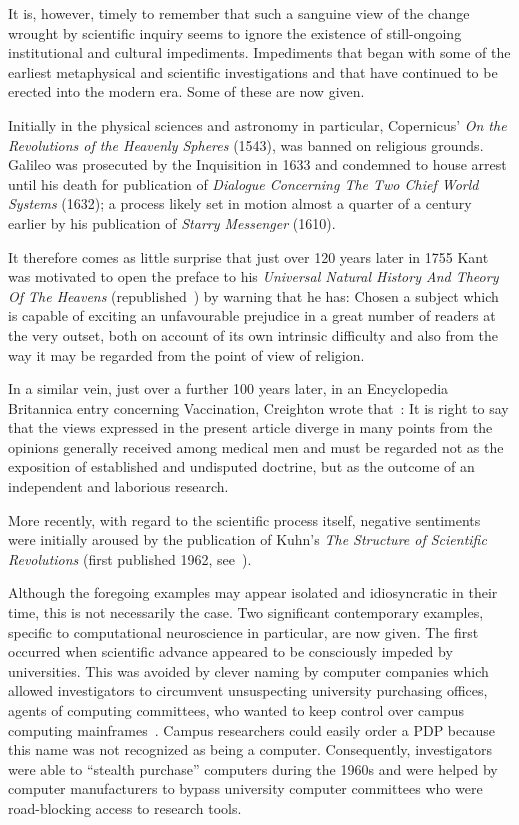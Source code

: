 \documentclass[10pt,letterpaper]{article}
\begin{document}
It is, however, timely to remember that such a sanguine view of the change wrought by scientific inquiry seems to ignore the existence of still-ongoing  institutional and cultural impediments. Impediments that began with some of the earliest metaphysical and scientific investigations and that have continued to be erected into the modern era. Some of these are now given.

Initially in the physical sciences and astronomy in particular, Copernicus' {\it{On the Revolutions of the Heavenly Spheres}} (1543), was banned on religious grounds. Galileo was prosecuted by the Inquisition in 1633 and condemned to house arrest until his death for publication of {\it{Dialogue Concerning The Two Chief World Systems}} (1632); a process likely set in motion almost a quarter of a century earlier by his publication of {\it{Starry Messenger}} (1610).

It therefore comes as little surprise that just over 120 years later in 1755 Kant~\cite{kant08} was motivated to open the preface to his {\it{Universal Natural History And Theory Of The Heavens}} (republished~\cite{kant08}) by warning that he has: Chosen a subject which is capable of exciting an unfavourable prejudice in a great number of readers at the very outset, both on account of its own intrinsic difficulty and also from the way it may be regarded from the point of view of religion.
 
In a similar vein, just over a further 100 years later, in an Encyclopedia Britannica entry concerning Vaccination, Creighton wrote that~\cite{creighton88}: It is right to say that the views expressed in the present article diverge in many points from the opinions generally received among medical men and must be regarded not as the exposition of established and undisputed doctrine, but as the outcome of an independent and laborious research.

More recently, with regard to the scientific process itself, negative sentiments were initially aroused by the publication of Kuhn's {\it The Structure of Scientific Revolutions} (first published 1962, see~\cite{bird22}).

Although the foregoing examples may appear isolated and idiosyncratic in their time, this is not necessarily the case. Two significant contemporary examples, specific to  computational neuroscience in particular, are now given. The first occurred when scientific advance appeared to be consciously impeded by universities. This was avoided by clever naming by computer companies which allowed investigators to circumvent unsuspecting university purchasing offices, agents of computing committees, who wanted to keep control over campus computing mainframes~\cite{Moore:2010vn}. Campus researchers could easily order a PDP because this name was not recognized as being a computer. Consequently, investigators were able to “stealth purchase” computers during the 1960s and were helped by computer manufacturers to bypass university computer committees who were road-blocking access to research tools.
\end{document}

